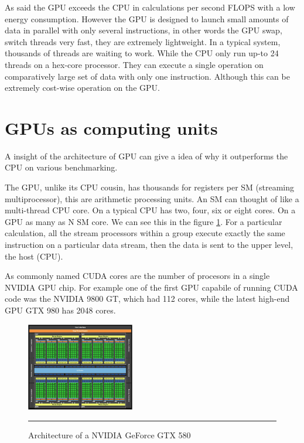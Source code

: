 As said the GPU exceeds the CPU in calculations per second FLOPS with a low energy consumption. However the GPU is designed to launch small amounts of data in parallel with only several instructions, in other words the GPU swap, switch threads very fast, they are extremely lightweight. In a typical system, thousands of threads are waiting to work. While the CPU only run up-to 24 threads on a hex-core processor. They can execute a single operation on comparatively large set of data with only one instruction. Although this can be extremely cost-wise operation on the GPU.

\section{GPUs as computing units}

A insight of the architecture of GPU can give a idea of  why it outperforms the CPU on various benchmarking.

The GPU, unlike its CPU cousin, has thousands for registers per SM (streaming multiprocessor), this are  arithmetic processing units. An SM can thought of like a multi-thread CPU core. On a typical CPU has two, four, six or eight cores. On a GPU as many as N SM core. We can see this in the figure \ref{fig:gpu_cpu}. For a particular calculation, all the stream
processors within a group execute exactly the same instruction on a particular data stream, then the data is sent to the upper level, the host (CPU). \cite{cook}

As commonly named CUDA cores are the number of procesors in a single NVIDIA GPU chip. For example one of the first GPU capabile of running CUDA code was the NVIDIA 9800 GT, which had 112 cores, while the latest high-end GPU GTX 980 has 2048 cores.

\begin{figure}[htbp]
	\centering
		\includegraphics[width=0.42\textwidth]{Figures/GPU_CPU.png}
		\rule{35em}{0.5pt}
	\caption[Architecture of a GPU]{Architecture of a NVIDIA GeForce GTX 580}
	\label{fig:gpu_cpu}
\end{figure}


